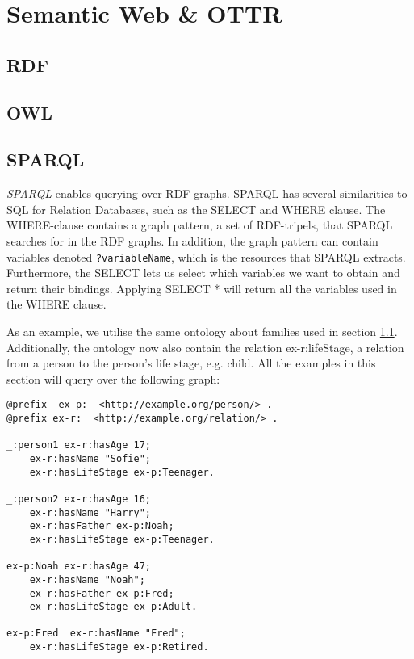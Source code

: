 
\chapter{Semantic Web \& OTTR}

\section{RDF}
\label{rdf}

\section{OWL}

\section{SPARQL}
\emph{SPARQL}\cite{SPARQL} enables querying over RDF graphs. SPARQL has several similarities to SQL for Relation Databases, such as the SELECT and WHERE clause. The WHERE-clause contains a graph pattern, a set of RDF-tripels, that SPARQL searches for in the RDF graphs. In addition, the graph pattern can contain variables denoted \lstinline{?variableName}, which is the resources that SPARQL extracts. Furthermore, the SELECT lets us select which variables we want to obtain and return their bindings. Applying SELECT * will return all the variables used in the WHERE clause.

\para
As an example, we utilise the same ontology about families used in section \ref{rdf}.  Additionally, the ontology now also contain the relation ex-r:lifeStage, a relation from a person to the person's life stage, e.g. child. All the examples in this section will query over the following graph: 

\para
\begin{lstlisting}[frame=single, language=turtle, frame=none]
@prefix  ex-p:  <http://example.org/person/> . 
@prefix ex-r:  <http://example.org/relation/> . 

_:person1 ex-r:hasAge 17;
    ex-r:hasName "Sofie";
    ex-r:hasLifeStage ex-p:Teenager.

_:person2 ex-r:hasAge 16;
    ex-r:hasName "Harry";
    ex-r:hasFather ex-p:Noah;
    ex-r:hasLifeStage ex-p:Teenager.

ex-p:Noah ex-r:hasAge 47;
    ex-r:hasName "Noah";
    ex-r:hasFather ex-p:Fred;
    ex-r:hasLifeStage ex-p:Adult. 

ex-p:Fred  ex-r:hasName "Fred";
    ex-r:hasLifeStage ex-p:Retired. 
\end{lstlisting}


